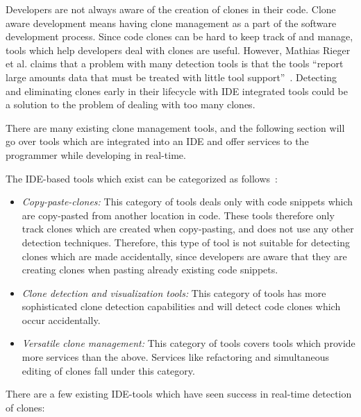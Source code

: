 Developers are not always aware of the creation of clones in their code. Clone aware
development means having clone management as a part of the software development process.
Since code clones can be hard to keep track of and manage, tools which help developers
deal with clones are useful. However, Mathias Rieger et al. claims that a problem with
many detection tools is that the tools ``report large amounts data that must be treated
with little tool support''~\cite[1]{InsightsSystemWideDuplication}. Detecting and
eliminating clones early in their lifecycle with IDE integrated tools could be a solution
to the problem of dealing with too many clones.

There are many existing clone management tools, and the following section will go over
tools which are integrated into an IDE and offer services to the programmer while
developing in real-time.

The IDE-based tools which exist can be categorized as
follows~\cite[8]{Udding_Towards_Convenient_Management}:

\begin{itemize}
	\item\textit{Copy-paste-clones:} This category of tools deals only with code snippets which are
	copy-pasted from another location in code. These tools therefore only track clones which
	are created when copy-pasting, and does not use any other detection techniques. Therefore,
	this type of tool is not suitable for detecting clones which are made accidentally, since
	developers are aware that they are creating clones when pasting already existing code
	snippets.

	\item\textit{Clone detection and visualization tools:} This category of tools has more
	sophisticated clone detection capabilities and will detect code clones which occur
	accidentally.

	\item\textit{Versatile clone management:} This category of tools covers tools which provide more
	services than the above. Services like refactoring and simultaneous editing of clones fall
	under this category.
\end{itemize}

There are a few existing IDE-tools which have seen success in real-time detection of clones:

